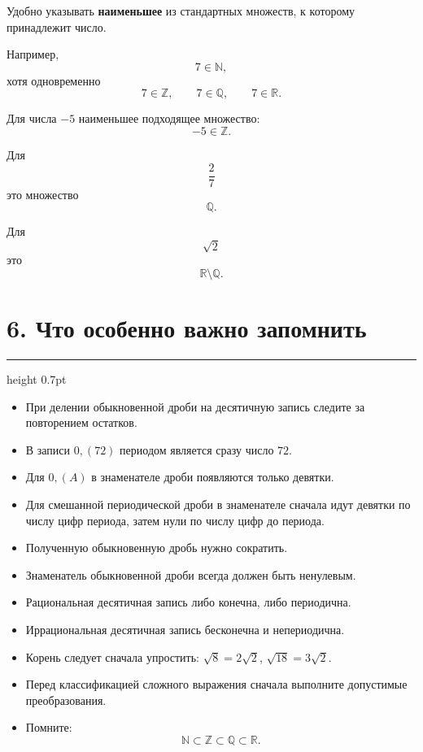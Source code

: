 \documentclass[a4paper,12pt]{article}
\newcommand{\checkitem}{\(\square\)}
\newcommand{\N}{\mathbb{N}}
\newcommand{\Z}{\mathbb{Z}}
\newcommand{\Q}{\mathbb{Q}}
\newcommand{\R}{\mathbb{R}}
\newcommand{\ruleline}{%
    \par\medskip
    {\color{accent}\hrule height 0.7pt}
    \medskip
}
\begin{document}
Удобно указывать \textbf{наименьшее} из стандартных множеств,
к которому принадлежит число.

Например,
\[
7\in\N,
\]
хотя одновременно
\[
7\in\Z,\qquad 7\in\Q,\qquad 7\in\R.
\]

Для числа \(-5\) наименьшее подходящее множество:
\[
-5\in\Z.
\]

Для
\[
\frac27
\]
это множество
\[
\Q.
\]

Для
\[
\sqrt2
\]
это
\[
\R\setminus\Q.
\]


\section*{\textcolor{darkaccent}{6. Что особенно важно запомнить}}

\ruleline

\begin{itemize}
    \item[\checkitem]
    При делении обыкновенной дроби на десятичную запись следите за
    повторением остатков.

    \item[\checkitem]
    В записи \(0{,}(72)\) периодом является сразу число \(72\).

    \item[\checkitem]
    Для \(0{,}(A)\) в знаменателе дроби появляются только девятки.

    \item[\checkitem]
    Для смешанной периодической дроби в знаменателе сначала идут
    девятки по числу цифр периода, затем нули по числу цифр до периода.

    \item[\checkitem]
    Полученную обыкновенную дробь нужно сократить.

    \item[\checkitem]
    Знаменатель обыкновенной дроби всегда должен быть ненулевым.

    \item[\checkitem]
    Рациональная десятичная запись либо конечна, либо периодична.

    \item[\checkitem]
    Иррациональная десятичная запись бесконечна и непериодична.

    \item[\checkitem]
    Корень следует сначала упростить: \(\sqrt{8}=2\sqrt2\),
    \(\sqrt{18}=3\sqrt2\).

    \item[\checkitem]
    Перед классификацией сложного выражения сначала выполните
    допустимые преобразования.

    \item[\checkitem]
    Помните:
    \[
    \N\subset\Z\subset\Q\subset\R.
    \]
\end{itemize}
\end{document}
